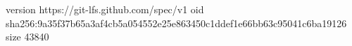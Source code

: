 version https://git-lfs.github.com/spec/v1
oid sha256:9a35f37b65a3af4cb5a054552e25e863450c1ddef1e66bb63c95041c6ba19126
size 43840
